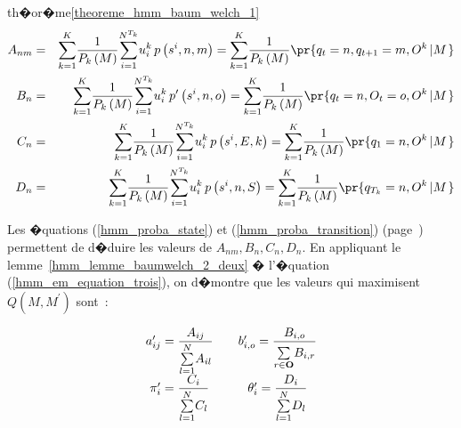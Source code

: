 \begin{xdemo}{th�or�me}{\ref{theoreme_hmm_baum_welch_1}}
        \begin{eqnarray}
            A_{nm}%
            & = &%
            \underset{k=1}{\overset{K}{\sum}}\dfrac{1}{P_{k}\left(  M\right)}\overset{N^{T_{k}}}
            {\underset{i=1}{\sum}}u_{i}^{k}\,p\left(  s^{i} ,n,m\right)%
            = %
            \underset{k=1}{\overset{K}{\sum}}\dfrac{1}{P_{k}\left(M\right)  }
            \pr{  q_{t}=n,q_{t+1}=m,O^{k}\left|  M\right.  } \label{hmm_em_demo_eq_un}%
        \\
            B_{n}%
            &  = & %
            \underset{k=1}{\overset{K}{\sum}}\dfrac{1}{P_{k}\left(  M\right)
             }\overset{N^{T_{k}}}{\underset{i=1}{\sum}}u_{i}^{k}\,p^{\prime}\left(
            s^{i},n,o\right)%
            = %
            \underset{k=1}{\overset{K}{\sum}}\dfrac{1}{P_{k}\left(M\right)  }
            \pr{ q_{t}=n,O_{t}=o,O^{k}\left|  M\right.  } \label{hmm_em_demo_eq_deux}
        \\
            C_{n}%
            &  =&%
            \underset{k=1}{\overset{K}{\sum}}\dfrac{1}{P_{k}
            \left(  M\right)}\overset{N^{T_{k}}}{\underset{i=1}{\sum}}u_{i}^{k}\,p\left(  s^{i} ,E,k\right)%
            = %
            \underset{k=1}{\overset{K}{\sum}}\dfrac{1}{P_{k}\left(M\right)  }
            \pr{  q_{1}=n,O^{k}\left|  M\right.  } \label{hmm_em_demo_eq_trois}%
        \\
            D_{n}%
            & = &%
            \underset{k=1}{\overset{K}{\sum}}\dfrac{1}{P_{k}\left(  M\right)}
            \overset{N^{T_{k}}}{\underset{i=1}{\sum}}u_{i}^{k}\,p\left(  s^{i} ,n,S\right)%
            = %
            \underset{k=1}{\overset{K}{\sum}}\dfrac{1}{P_{k}\left( M\right)  }
            \pr{  q_{T_{k}}=n,O^{k}\left|  M\right.  }\label{hmm_em_demo_eq_quatre}%
        \end{eqnarray}

Les �quations (\ref{hmm_proba_state}) et (\ref{hmm_proba_transition}) (page~\pageref{hmm_proba_transition}) permettent de d�duire les valeurs de $A_{nm}, B_{n}, C_{n}, D_{n}$. En appliquant le lemme~\ref{hmm_lemme_baumwelch_2_deux} � l'�quation (\ref{hmm_em_equation_trois}), on d�montre que les valeurs qui maximisent $Q\left(M,M^{\prime}\right)  $ sont~:%

        $$
        \begin{array}
        [c]{ccc}%
        a_{ij}^{\prime}=\dfrac{A_{ij}}{\overset{N}{\underset{l=1}{\sum}}A_{il}} &  &
        b_{i,o}^{\prime}=\dfrac{B_{i,o}}{\overset{}{\underset{r\in\mathbf{O}}{\sum}%
        }B_{i,r}}\\
        \pi_{i}^{\prime}=\dfrac{C_{i}}{\overset{N}{\underset{l=1}{\sum}}C_{l}} &  &
        \theta_{i}^{\prime}=\dfrac{D_{i}}{\overset{N}{\underset{l=1}{\sum}}D_{l}}%
        \end{array}
        $$


\end{xdemo}
